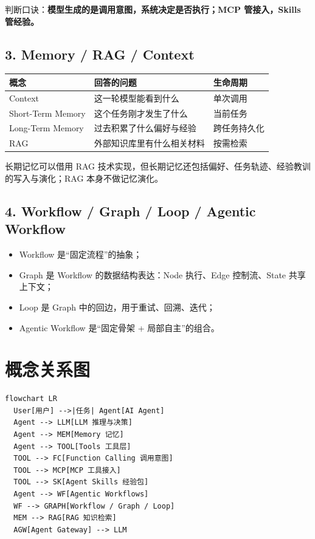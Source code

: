 \documentclass[9pt,a4paper,twocolumn]{ctexart}
\begin{document}
判断口诀：\textbf{模型生成的是调用意图，系统决定是否执行；MCP 管接入，Skills 管经验。}



\subsection*{3. Memory / RAG / Context}

{\footnotesize
\begin{tabular}{|p{}|p{}|p{}|}
\hline
\textbf{概念} & \textbf{回答的问题} & \textbf{生命周期} \\
\hline
Context & 这一轮模型能看到什么 & 单次调用 \\
\hline
Short-Term Memory & 这个任务刚才发生了什么 & 当前任务 \\
\hline
Long-Term Memory & 过去积累了什么偏好与经验 & 跨任务持久化 \\
\hline
RAG & 外部知识库里有什么相关材料 & 按需检索 \\
\hline
\end{tabular}
}



长期记忆可以借用 RAG 技术实现，但长期记忆还包括偏好、任务轨迹、经验教训的写入与演化；RAG 本身不做记忆演化。



\subsection*{4. Workflow / Graph / Loop / Agentic Workflow}

\begin{itemize}[itemsep=1pt, topsep=2pt]
  \item Workflow 是“固定流程”的抽象；
  \item Graph 是 Workflow 的数据结构表达：Node 执行、Edge 控制流、State 共享上下文；
  \item Loop 是 Graph 中的回边，用于重试、回溯、迭代；
  \item Agentic Workflow 是“固定骨架 + 局部自主”的组合。
\end{itemize}


\section*{概念关系图}


\begin{lstlisting}
flowchart LR
  User[用户] -->|任务| Agent[AI Agent]
  Agent --> LLM[LLM 推理与决策]
  Agent --> MEM[Memory 记忆]
  Agent --> TOOL[Tools 工具层]
  TOOL --> FC[Function Calling 调用意图]
  TOOL --> MCP[MCP 工具接入]
  TOOL --> SK[Agent Skills 经验包]
  Agent --> WF[Agentic Workflows]
  WF --> GRAPH[Workflow / Graph / Loop]
  MEM --> RAG[RAG 知识检索]
  AGW[Agent Gateway] --> LLM
\end{lstlisting}
\end{document}
